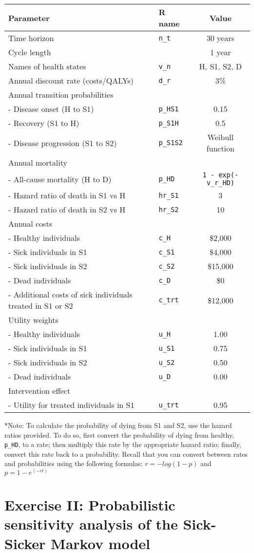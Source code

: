 \documentclass[
]{article}
\begin{document}
\begin{longtable}[]{@{}llc@{}}
\toprule
\textbf{Parameter} & \textbf{R name} & \textbf{Value}\tabularnewline
\midrule
\endhead
Time horizon & \texttt{n\_t} & 30 years\tabularnewline
Cycle length & & 1 year\tabularnewline
Names of health states & \texttt{v\_n} & H, S1, S2, D\tabularnewline
Annual discount rate (costs/QALYs) & \texttt{d\_r} & 3\%\tabularnewline
Annual transition probabilities & &\tabularnewline
- Disease onset (H to S1) & \texttt{p\_HS1} & 0.15\tabularnewline
- Recovery (S1 to H) & \texttt{p\_S1H} & 0.5\tabularnewline
- Disease progression (S1 to S2) & \texttt{p\_S1S2} & Weibull
function\tabularnewline
Annual mortality & &\tabularnewline
- All-cause mortality (H to D) & \texttt{p\_HD} &
\texttt{1\ -\ exp(-v\_r\_HD)}\tabularnewline
- Hazard ratio of death in S1 vs H & \texttt{hr\_S1} & 3\tabularnewline
- Hazard ratio of death in S2 vs H & \texttt{hr\_S2} & 10\tabularnewline
Annual costs & &\tabularnewline
- Healthy individuals & \texttt{c\_H} & \$2,000\tabularnewline
- Sick individuals in S1 & \texttt{c\_S1} & \$4,000\tabularnewline
- Sick individuals in S2 & \texttt{c\_S2} & \$15,000\tabularnewline
- Dead individuals & \texttt{c\_D} & \$0\tabularnewline
- Additional costs of sick individuals treated in S1 or S2 &
\texttt{c\_trt} & \$12,000\tabularnewline
Utility weights & &\tabularnewline
- Healthy individuals & \texttt{u\_H} & 1.00\tabularnewline
- Sick individuals in S1 & \texttt{u\_S1} & 0.75\tabularnewline
- Sick individuals in S2 & \texttt{u\_S2} & 0.50\tabularnewline
- Dead individuals & \texttt{u\_D} & 0.00\tabularnewline
Intervention effect & &\tabularnewline
- Utility for treated individuals in S1 & \texttt{u\_trt} &
0.95\tabularnewline
\bottomrule
\end{longtable}

*Note: To calculate the probability of dying from S1 and S2, use the
hazard ratios provided. To do so, first convert the probability of dying
from healthy, \texttt{p\_HD}, to a rate; then multiply this rate by the
appropriate hazard ratio; finally, convert this rate back to a
probability. Recall that you can convert between rates and probabilities
using the following formulas: \(r = -log(1-p)\) and \(p = 1-e^{(-rt)}\)

\hypertarget{exercise-ii-probabilistic-sensitivity-analysis-of-the-sick-sicker-markov-model}{%
\section{Exercise II: Probabilistic sensitivity analysis of the
Sick-Sicker Markov
model}\label{exercise-ii-probabilistic-sensitivity-analysis-of-the-sick-sicker-markov-model}}
\end{document}
